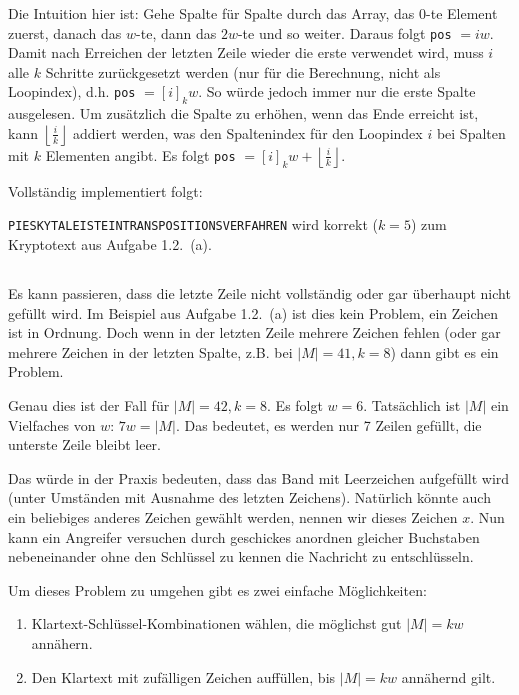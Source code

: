 \documentclass{../crypto}
\begin{document}
Die Intuition hier ist: Gehe Spalte für Spalte durch das Array, das $0$-te Element zuerst, danach das $w$-te, dann das $2w$-te und so weiter. Daraus folgt \texttt{pos} $= iw$. Damit nach Erreichen der letzten Zeile wieder die erste verwendet wird, muss $i$ alle $k$ Schritte zurückgesetzt werden (nur für die Berechnung, nicht als Loopindex), d.h. \texttt{pos} $= \left[i\right]_kw$. So würde jedoch immer nur die erste Spalte ausgelesen. Um zusätzlich die Spalte zu erhöhen, wenn das Ende erreicht ist, kann $\left\lfloor\frac{i}{k}\right\rfloor$ addiert werden, was den Spaltenindex für den Loopindex $i$ bei Spalten mit $k$ Elementen angibt. Es folgt \texttt{pos} $ = \left[i\right]_kw + \left\lfloor\frac{i}{k}\right\rfloor$.

Vollständig implementiert folgt:

\texttt{PIESKYTALEISTEINTRANSPOSITIONSVERFAHREN} wird korrekt ($k=5$) zum Kryptotext aus Aufgabe 1.2.~(a).

\subsection{}
Es kann passieren, dass die letzte Zeile nicht vollständig oder gar überhaupt nicht gefüllt wird. Im Beispiel aus Aufgabe 1.2.~(a) ist dies kein Problem, ein Zeichen ist in Ordnung.
Doch wenn in der letzten Zeile mehrere Zeichen fehlen (oder gar mehrere Zeichen in der letzten Spalte, z.B. bei $|M|=41, k=8$) dann gibt es ein Problem.

Genau dies ist der Fall für $|M|=42, k=8$. Es folgt $w=6$. Tatsächlich ist $|M|$ ein Vielfaches von $w$: $7w=|M|$. Das bedeutet, es werden nur 7 Zeilen gefüllt, die unterste
Zeile bleibt leer.

Das würde in der Praxis bedeuten, dass das Band mit Leerzeichen aufgefüllt wird (unter Umständen mit Ausnahme des letzten Zeichens). Natürlich könnte auch ein beliebiges anderes Zeichen gewählt werden, nennen wir dieses Zeichen $x$. Nun kann ein Angreifer versuchen durch geschickes anordnen gleicher Buchstaben nebeneinander ohne den Schlüssel zu kennen die Nachricht zu entschlüsseln.

Um dieses Problem zu umgehen gibt es zwei einfache Möglichkeiten:

\begin{enumerate}
	\item Klartext-Schlüssel-Kombinationen wählen, die möglichst gut $|M|=kw$ annähern.
  \item Den Klartext mit zufälligen Zeichen auffüllen, bis $|M|=kw$ annähernd gilt.
\end{enumerate}
\end{document}
